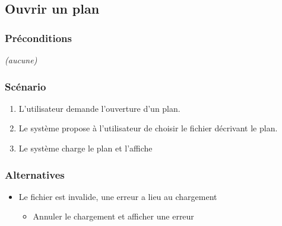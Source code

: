 \subsection{Ouvrir un plan}\hypertarget{ouvrir-un-plan}{}\label{ouvrir-un-plan}

\subsubsection{Préconditions}\hypertarget{prconditions}{}\label{prconditions}

\emph{(aucune)}

\subsubsection{Scénario}\hypertarget{scnario}{}\label{scnario}

\begin{enumerate}
\item L'utilisateur demande l'ouverture d'un plan.
\item Le système propose à l'utilisateur de choisir le fichier décrivant le plan.
\item Le système charge le plan et l'affiche
\end{enumerate}

\subsubsection{Alternatives}\hypertarget{alternatives}{}\label{alternatives}

\begin{itemize}
\item Le fichier est invalide, une erreur a lieu au chargement


\begin{itemize}
\item Annuler le chargement et afficher une erreur
\end{itemize}
\end{itemize}
